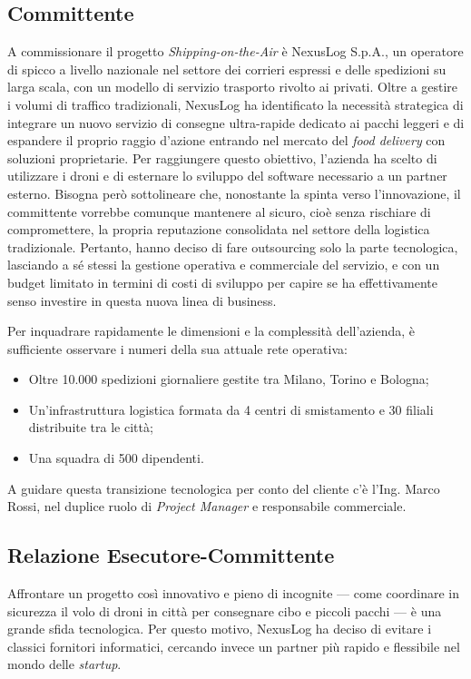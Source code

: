 \documentclass[12pt, a4paper]{article}
\begin{document}
\subsection{Committente}
A commissionare il progetto \textit{Shipping-on-the-Air} è NexusLog S.p.A., un operatore di spicco a livello nazionale nel settore dei corrieri espressi e delle spedizioni su larga scala, con un modello di servizio trasporto rivolto ai privati. Oltre a gestire i volumi di traffico tradizionali, NexusLog ha identificato la necessità strategica di integrare un nuovo servizio di consegne ultra-rapide dedicato ai pacchi leggeri e di espandere il proprio raggio d'azione entrando nel mercato del \textit{food delivery} con soluzioni proprietarie. Per raggiungere questo obiettivo, l'azienda ha scelto di utilizzare i droni e di esternare lo sviluppo del software necessario a un partner esterno. Bisogna però sottolineare che, nonostante la spinta verso l'innovazione, il committente vorrebbe comunque mantenere al sicuro, cioè senza rischiare di compromettere, la propria reputazione consolidata nel settore della logistica tradizionale. Pertanto, hanno deciso di fare outsourcing solo la parte tecnologica, lasciando a sé stessi la gestione operativa e commerciale del servizio, e con un budget limitato in termini di costi di sviluppo per capire se ha effettivamente senso investire in questa nuova linea di business.

Per inquadrare rapidamente le dimensioni e la complessità dell'azienda, è sufficiente osservare i numeri della sua attuale rete operativa:
\begin{itemize}
    \item Oltre 10.000 spedizioni giornaliere gestite tra Milano, Torino e Bologna;
    \item Un'infrastruttura logistica formata da 4 centri di smistamento e 30 filiali distribuite tra le città;
    \item Una squadra di 500 dipendenti.
\end{itemize}

A guidare questa transizione tecnologica per conto del cliente c'è l'Ing. Marco Rossi, nel duplice ruolo di \textit{Project Manager} e responsabile commerciale. 

\subsection{Relazione Esecutore-Committente}
Affrontare un progetto così innovativo e pieno di incognite — come coordinare in sicurezza il volo di droni in città per consegnare cibo e piccoli pacchi — è una grande sfida tecnologica. Per questo motivo, NexusLog ha deciso di evitare i classici fornitori informatici, cercando invece un partner più rapido e flessibile nel mondo delle \textit{startup}.
\end{document}
